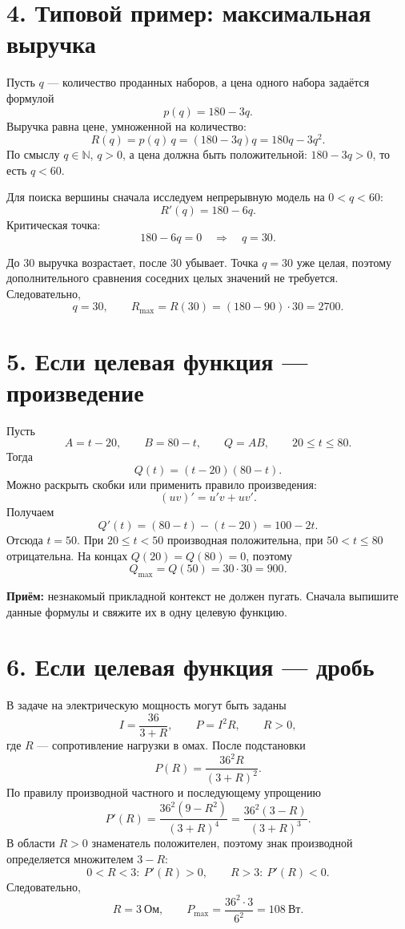 \documentclass[a4paper,12pt]{article}
\newcommand{\sectionline}{\vspace{1mm}{\color{accent}\hrule height 0.7pt}\vspace{3mm}}
\newcommand{\key}[1]{\textbf{\color{darkaccent}#1}}
\begin{document}
\section*{4. Типовой пример: максимальная выручка}
\sectionline
Пусть $q$ --- количество проданных наборов, а цена одного набора задаётся формулой
\[
  p(q)=180-3q.
\]
Выручка равна цене, умноженной на количество:
\[
  R(q)=p(q)\,q=(180-3q)q=180q-3q^2.
\]
По смыслу $q\in\mathbb N$, $q>0$, а цена должна быть положительной: $180-3q>0$, то есть $q<60$.

Для поиска вершины сначала исследуем непрерывную модель на $0<q<60$:
\[
  R'(q)=180-6q.
\]
Критическая точка:
\[
  180-6q=0 \quad\Longrightarrow\quad q=30.
\]

\begin{center}
\end{center}

До $30$ выручка возрастает, после $30$ убывает. Точка $q=30$ уже целая, поэтому дополнительного сравнения соседних целых значений не требуется. Следовательно,
\[
  q=30,\qquad R_{\max}=R(30)=(180-90)\cdot30=2700.
\]

\section*{5. Если целевая функция --- произведение}
\sectionline
Пусть
\[
  A=t-20,\qquad B=80-t,\qquad Q=AB,\qquad 20\le t\le80.
\]
Тогда
\[
  Q(t)=(t-20)(80-t).
\]
Можно раскрыть скобки или применить правило произведения:
\[
  (uv)'=u'v+uv'.
\]
Получаем
\[
  Q'(t)=(80-t)-(t-20)=100-2t.
\]
Отсюда $t=50$. При $20\le t<50$ производная положительна, при $50<t\le80$ отрицательна. На концах $Q(20)=Q(80)=0$, поэтому
\[
  Q_{\max}=Q(50)=30\cdot30=900.
\]

\key{Приём:} незнакомый прикладной контекст не должен пугать. Сначала выпишите данные формулы и свяжите их в одну целевую функцию.

\section*{6. Если целевая функция --- дробь}
\sectionline
В задаче на электрическую мощность могут быть заданы
\[
  I=\frac{36}{3+R},\qquad P=I^2R,\qquad R>0,
\]
где $R$ --- сопротивление нагрузки в омах. После подстановки
\[
  P(R)=\frac{36^2R}{(3+R)^2}.
\]
По правилу производной частного и последующему упрощению
\[
  P'(R)=\frac{36^2(9-R^2)}{(3+R)^4}
       =\frac{36^2(3-R)}{(3+R)^3}.
\]
В области $R>0$ знаменатель положителен, поэтому знак производной определяется множителем $3-R$:
\[
  0<R<3:~P'(R)>0,\qquad R>3:~P'(R)<0.
\]
Следовательно,
\[
  R=3~\text{Ом},\qquad
  P_{\max}=\frac{36^2\cdot3}{6^2}=108~\text{Вт}.
\]
\end{document}
